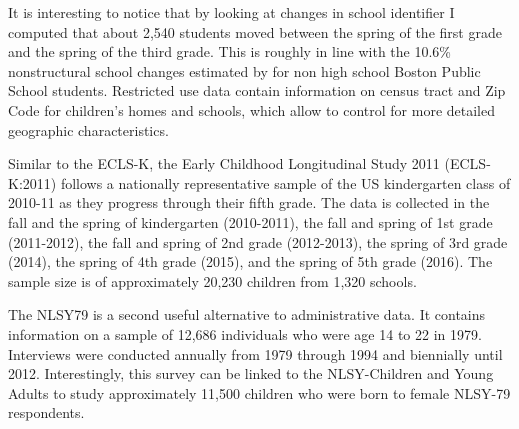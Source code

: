 \documentclass[twoside,12pt]{article}
\begin{document}
It is interesting to notice that by looking at changes in school identifier I computed that about 2,540 students moved between the spring of the first grade and the spring of the third grade. This is roughly in line with the 10.6\% nonstructural school changes estimated by \citep{bradbury2013effect} for non high school Boston Public School students. Restricted use data contain information on census tract and Zip Code for children's homes and schools, which allow to control for more detailed geographic characteristics.

Similar to the ECLS-K, the Early Childhood Longitudinal Study 2011 (ECLS-K:2011) follows a nationally representative sample of the US kindergarten class of 2010-11 as they progress through their fifth grade. The data is collected in the fall and the spring of kindergarten (2010-2011), the fall and spring of 1st grade (2011-2012), the fall and spring of 2nd grade (2012-2013), the spring of 3rd grade (2014), the spring of 4th grade (2015), and the spring of 5th grade (2016). The sample size is of approximately 20,230 children from 1,320 schools.

The NLSY79 is a second useful alternative to administrative data. It contains information on a sample of 12,686 individuals who were age 14 to 22 in 1979. Interviews were conducted annually from 1979 through 1994 and biennially until 2012. Interestingly, this survey can be linked to the NLSY-Children and Young Adults to study approximately 11,500 children who were born to female NLSY-79 respondents. 

\newpage

\end{document}
